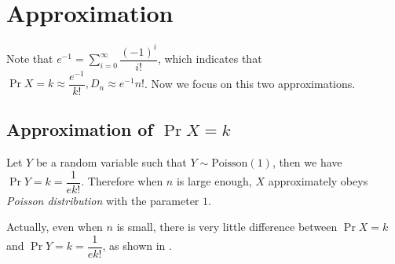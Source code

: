 
\section{Approximation}
Note that $ e^{-1} = \sum_{i=0}^{\infty}\dfrac{(-1)^i}{i!}$,
which indicates that $\Pr{X=k}\approx \dfrac{e^{-1}}{k!},D_n \approx e^{-1}n! $. Now we focus on this two approximations.

\subsection{Approximation of $ \Pr{X=k}$}
Let $ Y$ be a random variable such that $ Y\sim \text{Poisson}(1)$, then
we have $ \Pr{Y=k} = \dfrac{1}{ek!}$.
Therefore when $ n$ is large enough,
$ X$ approximately obeys \emph{Poisson distribution} with the parameter $ 1$.

Actually, even when $ n$ is small,
there is very little difference between $ \Pr{X=k}$ and $ \Pr{Y=k}=\dfrac{1}{ek!}$,
as shown in .

